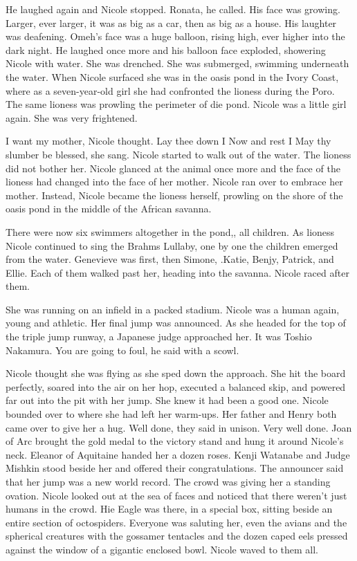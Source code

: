 \documentclass[]{article}
\begin{document}
{{He laughed again and Nicole stopped.  Ronata, he called.  His face was growing.  Larger, ever larger, it was as big as a car, then as big as a house.  His laughter was deafening.  Omeh’s face was a huge balloon, rising high, ever higher into the dark night.  He laughed once more and his balloon face exploded, showering Nicole with water.  She was drenched.  She was submerged, swimming underneath the water.  When Nicole surfaced she was in the oasis pond in the Ivory Coast, where as a seven-year-old girl she had confronted the lioness during the Poro.  The same lioness was prowling the perimeter of die pond.  Nicole was a little girl again.  She was very frightened.

I want my mother, Nicole thought.  Lay thee down I Now and rest I May thy slumber be blessed, she sang.  Nicole started to walk out of the water.  The lioness did not bother her.  Nicole glanced at the animal once more and the face of the lioness had changed into the face of her mother.  Nicole ran over to embrace her mother.  Instead, Nicole became the lioness herself, prowling on the shore of the oasis pond in the middle of the African savanna.

There were now six swimmers altogether in the pond,, all children.  As lioness Nicole continued to sing the Brahms Lullaby, one by one the children emerged from the water.  Genevieve was first, then Simone, .Katie, Benjy, Patrick, and Ellie.  Each of them walked past her, heading into the savanna.  Nicole raced after them.

She was running on an infield in a packed stadium.  Nicole was a human again, young and athletic.  Her final jump was announced.  As she headed for the top of the triple jump runway, a Japanese judge approached her.  It was Toshio Nakamura.  You are going to foul, he said with a scowl.

Nicole thought she was flying as she sped down the approach.  She hit the board perfectly, soared into the air on her hop, executed a balanced skip, and powered far out into the pit with her jump.  She knew it had been a good one.  Nicole bounded over to where she had left her warm-ups.  Her father and Henry both came over to give her a hug.  Well done, they said in unison.  Very well done.  Joan of Arc brought the gold medal to the victory stand and hung it around Nicole’s neck.  Eleanor of Aquitaine handed her a dozen roses.  Kenji Watanabe and Judge Mishkin stood beside her and offered their congratulations.  The announcer said that her jump was a new world record.  The crowd was giving her a standing ovation.  Nicole looked out at the sea of faces and noticed that there weren’t just humans in the crowd.  Hie Eagle was there, in a special box, sitting beside an entire section of octospiders.  Everyone was saluting her, even the avians and the spherical creatures with the gossamer tentacles and the dozen caped eels pressed against the window of a gigantic enclosed bowl.  Nicole waved to them all.

}}
\end{document}
